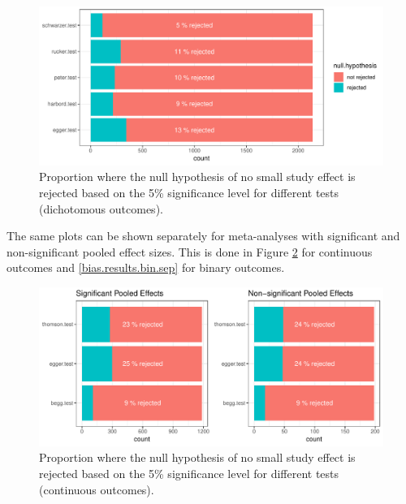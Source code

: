 \documentclass[11pt,a4paper,twoside]{book}\usepackage[]{graphicx}\usepackage[]{color}
\newenvironment{knitrout}{}{} %
\begin{document}
\begin{figure}
\begin{knitrout}
\color{fgcolor}

{\centering \includegraphics[width=\textwidth-3cm]{figure/ch02_figunnamed-chunk-27-1} 

}



\end{knitrout}
\caption{Proportion where the null hypothesis of no small study effect is rejected based on the 5\% significance level for different tests (dichotomous outcomes).}
\label{bias.results.bin}
\end{figure}

The same plots can be shown separately for meta-analyses with significant and non-significant pooled effect sizes. This is done in Figure \ref{bias.results.cont.sep} for continuous outcomes and \ref{bias.results.bin.sep} for binary outcomes.

\begin{figure}
\begin{knitrout}
\color{fgcolor}

{\centering \includegraphics[width=\textwidth-3cm]{figure/ch02_figunnamed-chunk-28-1} 

}



\end{knitrout}
\caption{Proportion where the null hypothesis of no small study effect is rejected based on the 5\% significance level for different tests (continuous outcomes).}
\label{bias.results.cont.sep}
\end{figure}
\end{document}
